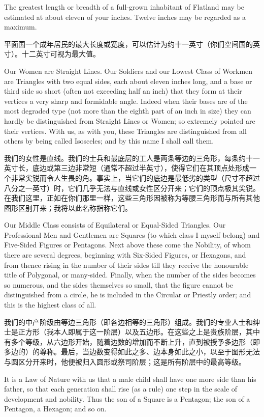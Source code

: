 \documentclass[12pt,UTF8]{ctexbook}
\begin{document}
The greatest length or breadth of a full-grown inhabitant of Flatland may be estimated at about eleven of your inches. Twelve inches may be regarded as a maximum.

平面国一个成年居民的最大长度或宽度，可以估计为约十一英寸（你们空间国的英寸）。十二英寸可视为最大值。

Our Women are Straight Lines. Our Soldiers and our Lowest Class of Workmen are Triangles with two equal sides, each about eleven inches long, and a base or third side so short (often not exceeding half an inch) that they form at their vertices a very sharp and formidable angle. Indeed when their bases are of the most degraded type (not more than the eighth part of an inch in size) they can hardly be distinguished from Straight Lines or Women; so extremely pointed are their vertices. With us, as with you, these Triangles are distinguished from all others by being called Isosceles; and by this name I shall call them.

我们的女性是直线。我们的士兵和最底层的工人是两条等边的三角形，每条约十一英寸长，底边或第三边非常短（通常不超过半英寸），使得它们在其顶点处形成一个非常尖锐而令人生畏的角。事实上，当它们的底边是最低劣的类型（尺寸不超过八分之一英寸）时，它们几乎无法与直线或女性区分开来；它们的顶点极其尖锐。在我们这里，正如在你们那里一样，这些三角形因被称为等腰三角形而与所有其他图形区别开来；我将以此名称指称它们。

Our Middle Class consists of Equilateral or Equal-Sided Triangles. Our Professional Men and Gentlemen are Squares (to which class I myself belong) and Five-Sided Figures or Pentagons. Next above these come the Nobility, of whom there are several degrees, beginning with Six-Sided Figures, or Hexagons, and from thence rising in the number of their sides till they receive the honourable title of Polygonal, or many-sided. Finally, when the number of the sides becomes so numerous, and the sides themselves so small, that the figure cannot be distinguished from a circle, he is included in the Circular or Priestly order; and this is the highest class of all.

我们的中产阶级由等边三角形（即各边相等的三角形）组成。我们的专业人士和绅士是正方形（我本人即属于这一阶层）以及五边形。在这些之上是贵族阶层，其中有多个等级，从六边形开始，随着边数的增加而不断上升，直到被授予多边形（即多边的）的尊称。最后，当边数变得如此之多、边本身如此之小，以至于图形无法与圆区分开来时，他便被归入圆形或祭司阶层；这是所有阶层中的最高等级。

It is a Law of Nature with us that a male child shall have one more side than his father, so that each generation shall rise (as a rule) one step in the scale of development and nobility. Thus the son of a Square is a Pentagon; the son of a Pentagon, a Hexagon; and so on.
\end{document}

